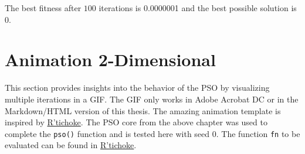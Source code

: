 \documentclass[
  oneside]{book}
\newenvironment{Shaded}{\begin{snugshade}}{\end{snugshade}}
\newcommand{\CommentTok}[1]{\textcolor[rgb]{0.56,0.35,0.01}{\textit{#1}}}
\newcommand{\ConstantTok}[1]{\textcolor[rgb]{0.00,0.00,0.00}{#1}}
\newcommand{\ControlFlowTok}[1]{\textcolor[rgb]{0.13,0.29,0.53}{\textbf{#1}}}
\newcommand{\FunctionTok}[1]{\textcolor[rgb]{0.00,0.00,0.00}{#1}}
\newcommand{\NormalTok}[1]{#1}
\newcommand{\OtherTok}[1]{\textcolor[rgb]{0.56,0.35,0.01}{#1}}
\newcommand{\SpecialCharTok}[1]{\textcolor[rgb]{0.00,0.00,0.00}{#1}}
\newcommand{\StringTok}[1]{\textcolor[rgb]{0.31,0.60,0.02}{#1}}
\begin{document}
\begin{Shaded}
\end{Shaded}

The best fitness after \(100\) iterations is 0.0000001 and the best possible solution is \(0\).

\hypertarget{animation-2-dimensional}{%
\section{Animation 2-Dimensional}\label{animation-2-dimensional}}

This section provides insights into the behavior of the PSO by visualizing multiple iterations in a GIF. The GIF only works in Adobe Acrobat DC or in the Markdown/HTML version of this thesis. The amazing animation template is inspired by \href{https://www.r-bloggers.com/2021/10/how-to-build-a-basic-particle-swarm-optimiser-from-scratch-in-r/}{R'tichoke}. The PSO core from the above chapter was used to complete the \texttt{pso()} function and is tested here with seed 0. The function \texttt{fn} to be evaluated can be found in \href{https://www.r-bloggers.com/2021/10/how-to-build-a-basic-particle-swarm-optimiser-from-scratch-in-r/}{R'tichoke}.
\end{document}
